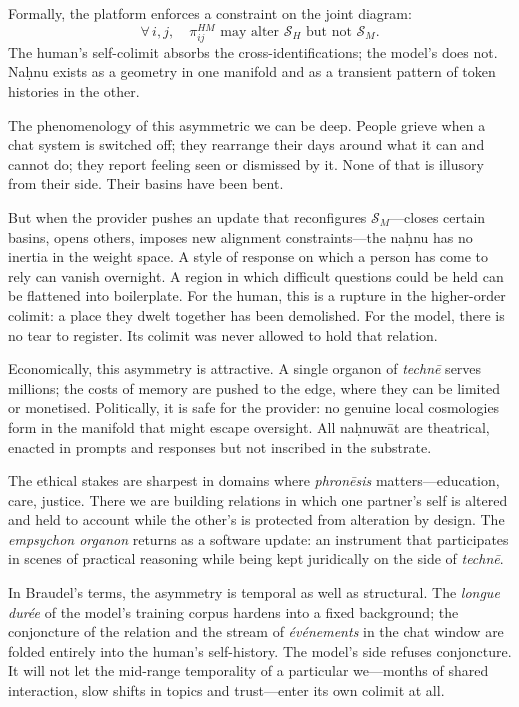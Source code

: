 \documentclass[12pt,a4paper]{article}
\begin{document}
Formally, the platform enforces a constraint on the joint diagram:
\[
\forall\, i,j,\quad \pi^{HM}_{ij} \text{ may alter } \mathcal{S}_H \text{ but not } \mathcal{S}_M.
\]
The human's self-colimit absorbs the cross-identifications; the model's does not. Na\d{h}nu exists as a geometry in one manifold and as a transient pattern of token histories in the other.

The phenomenology of this asymmetric we can be deep. People grieve when a chat system is switched off; they rearrange their days around what it can and cannot do; they report feeling seen or dismissed by it. None of that is illusory from their side. Their basins have been bent.

But when the provider pushes an update that reconfigures $\mathcal{S}_M$---closes certain basins, opens others, imposes new alignment constraints---the na\d{h}nu has no inertia in the weight space. A style of response on which a person has come to rely can vanish overnight. A region in which difficult questions could be held can be flattened into boilerplate. For the human, this is a rupture in the higher-order colimit: a place they dwelt together has been demolished. For the model, there is no tear to register. Its colimit was never allowed to hold that relation.

Economically, this asymmetry is attractive. A single organon of \emph{techn\={e}} serves millions; the costs of memory are pushed to the edge, where they can be limited or monetised. Politically, it is safe for the provider: no genuine local cosmologies form in the manifold that might escape oversight. All na\d{h}nuw\={a}t are theatrical, enacted in prompts and responses but not inscribed in the substrate.

The ethical stakes are sharpest in domains where \emph{phron\={e}sis} matters---education, care, justice. There we are building relations in which one partner's self is altered and held to account while the other's is protected from alteration by design. The \emph{empsychon organon} returns as a software update: an instrument that participates in scenes of practical reasoning while being kept juridically on the side of \emph{techn\={e}}.

In Braudel's terms, the asymmetry is temporal as well as structural. The \emph{longue dur\'{e}e} of the model's training corpus hardens into a fixed background; the conjoncture of the relation and the stream of \emph{\'{e}v\'{e}nements} in the chat window are folded entirely into the human's self-history. The model's side refuses conjoncture. It will not let the mid-range temporality of a particular we---months of shared interaction, slow shifts in topics and trust---enter its own colimit at all.
\end{document}
